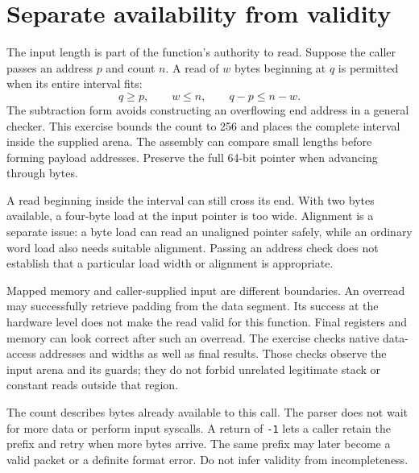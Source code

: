 \section{Separate availability from validity}
The input length is part of the function's authority to read. Suppose the caller
passes an address \(p\) and count \(n\). A read of \(w\) bytes beginning at
\(q\) is permitted when its entire interval fits:
\[
  q\geq p,\qquad w\leq n,\qquad q-p\leq n-w.
\]
The subtraction form avoids constructing an overflowing end address in a general
checker. This exercise bounds the count to 256 and places the complete interval
inside the supplied arena. The assembly can compare small lengths before forming
payload addresses. Preserve the full 64-bit pointer when advancing through bytes.

A read beginning inside the interval can still cross its end. With two bytes
available, a four-byte load at the input pointer is too wide. Alignment is a
separate issue: a byte load can read an unaligned pointer safely, while an ordinary
word load also needs suitable alignment. Passing an address check does not establish
that a particular load width or alignment is appropriate.

Mapped memory and caller-supplied input are different boundaries. An overread may
successfully retrieve padding from the data segment. Its success at the hardware
level does not make the read valid for this function. Final registers and memory
can look correct after such an overread. The exercise checks native data-access
addresses and widths as well as final results. Those checks observe the input
arena and its guards; they do not forbid unrelated legitimate stack or constant
reads outside that region.

The count describes bytes already available to this call. The parser does not wait
for more data or perform input syscalls. A return of \texttt{-1} lets a caller retain
the prefix and retry when more bytes arrive. The same prefix may later become a
valid packet or a definite format error. Do not infer validity from incompleteness.
